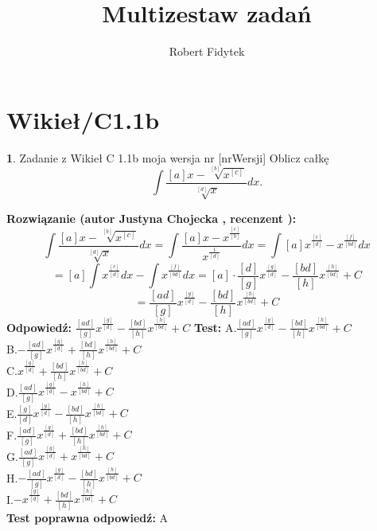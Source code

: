 \documentclass[12pt, a4paper]{article}
\title{Multizestaw zadań}
\author{Robert Fidytek}
\date{}
\theoremstyle{definition} %
\newtheorem{zad}{}
\newcommand{\kategoria}[1]{\section{#1}} %
\newcommand{\zadStart}[1]{\begin{zad}#1\newline} %
\newcommand{\zadStop}{\end{zad}}   %
\newcommand{\rozwStart}[2]{\noindent \textbf{Rozwiązanie (autor #1 , recenzent #2): }\newline} %
\newcommand{\rozwStop}{\newline}                                            %
\newcommand{\odpStart}{\noindent \textbf{Odpowiedź:}\newline}    %
\newcommand{\odpStop}{\newline}                                             %
\newcommand{\testStart}{\noindent \textbf{Test:}\newline} %
\newcommand{\testStop}{\newline} %
\newcommand{\kluczStart}{\noindent \textbf{Test poprawna odpowiedź:}\newline} %
\newcommand{\kluczStop}{\newline} %
\begin{document}
\maketitle
\kategoria{Wikieł/C1.1b}
\zadStart{Zadanie z Wikieł C 1.1b moja wersja nr [nrWersji]}
Oblicz całkę $$\int \frac{[a]x-\sqrt[[b]]{x^{[c]}}}{\sqrt[[d]]{x}} dx.$$
\zadStop
\rozwStart{Justyna Chojecka}{}
$$\int \frac{[a]x-\sqrt[[b]]{x^{[c]}}}{\sqrt[[d]]{x}} dx=\int \frac{[a]x-x^{\frac{[c]}{[b]}}}{x^{\frac{1}{[d]}}}dx=\int[a]x^{\frac{[e]}{[d]}}-x^{\frac{[f]}{[bd]}}dx$$$$=[a]\int x^{\frac{[e]}{[d]}}dx -\int x^{\frac{[f]}{[bd]}}dx=[a]\cdot \frac{[d]}{[g]}x^{\frac{[g]}{[d]}}-\frac{[bd]}{[h]}x^{\frac{[h]}{[bd]}}+C$$$$=\frac{[ad]}{[g]}x^{\frac{[g]}{[d]}}-\frac{[bd]}{[h]}x^{\frac{[h]}{[bd]}}+C$$
\rozwStop
\odpStart
$\frac{[ad]}{[g]}x^{\frac{[g]}{[d]}}-\frac{[bd]}{[h]}x^{\frac{[h]}{[bd]}}+C$
\odpStop
\testStart
A.$\frac{[ad]}{[g]}x^{\frac{[g]}{[d]}}-\frac{[bd]}{[h]}x^{\frac{[h]}{[bd]}}+C$\\
B.$-\frac{[ad]}{[g]}x^{\frac{[g]}{[d]}}+\frac{[bd]}{[h]}x^{\frac{[h]}{[bd]}}+C$\\
C.$x^{\frac{[g]}{[d]}}+\frac{[bd]}{[h]}x^{\frac{[h]}{[bd]}}+C$\\
D.$\frac{[ad]}{[g]}x^{\frac{[g]}{[d]}}-x^{\frac{[h]}{[bd]}}+C$\\
E.$\frac{[g]}{[d]}x^{\frac{[g]}{[d]}}-\frac{[bd]}{[h]}x^{\frac{[h]}{[bd]}}+C$\\
F.$\frac{[ad]}{[g]}x^{\frac{[g]}{[d]}}+\frac{[bd]}{[h]}x^{\frac{[h]}{[bd]}}+C$\\
G.$\frac{[ad]}{[g]}x^{\frac{[g]}{[d]}}+x^{\frac{[h]}{[bd]}}+C$\\
H.$-\frac{[ad]}{[g]}x^{\frac{[g]}{[d]}}-\frac{[bd]}{[h]}x^{\frac{[h]}{[bd]}}+C$\\
I.$-x^{\frac{[g]}{[d]}}+\frac{[bd]}{[h]}x^{\frac{[h]}{[bd]}}+C$\\
\testStop
\kluczStart
A
\kluczStop
\end{document}
